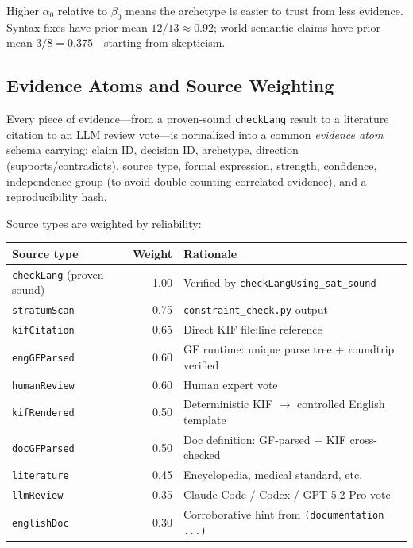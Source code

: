 \documentclass[11pt]{article}
\theoremstyle{definition}
\theoremstyle{plain}
\begin{document}
Higher $\alpha_0$ relative to $\beta_0$ means the archetype is
easier to trust from less evidence.  Syntax fixes have prior mean
$12/13 \approx 0.92$; world-semantic claims have prior mean
$3/8 = 0.375$---starting from skepticism.

\subsection{Evidence Atoms and Source Weighting}

Every piece of evidence---from a proven-sound \texttt{checkLang}
result to a literature citation to an LLM review vote---is
normalized into a common \emph{evidence atom} schema carrying:
claim ID, decision ID, archetype, direction (supports/contradicts),
source type, formal expression, strength, confidence, independence
group (to avoid double-counting correlated evidence), and a
reproducibility hash.

Source types are weighted by reliability:

\begin{center}\small
\begin{tabular}{@{}lrl@{}}
\toprule
\textbf{Source type} & \textbf{Weight} & \textbf{Rationale} \\
\midrule
\texttt{checkLang} (proven sound) & 1.00 & Verified by \texttt{checkLangUsing\_sat\_sound} \\
\texttt{stratumScan} & 0.75 & \texttt{constraint\_check.py} output \\
\texttt{kifCitation} & 0.65 & Direct KIF file:line reference \\
\texttt{engGFParsed} & 0.60 & GF runtime: unique parse tree + roundtrip verified \\
\texttt{humanReview} & 0.60 & Human expert vote \\
\texttt{kifRendered} & 0.50 & Deterministic KIF $\to$ controlled English template \\
\texttt{docGFParsed} & 0.50 & Doc definition: GF-parsed + KIF cross-checked \\
\texttt{literature} & 0.45 & Encyclopedia, medical standard, etc. \\
\texttt{llmReview} & 0.35 & Claude Code / Codex / GPT-5.2 Pro vote \\
\texttt{englishDoc} & 0.30 & Corroborative hint from \texttt{(documentation ...)} \\
\bottomrule
\end{tabular}
\end{center}
\end{document}
